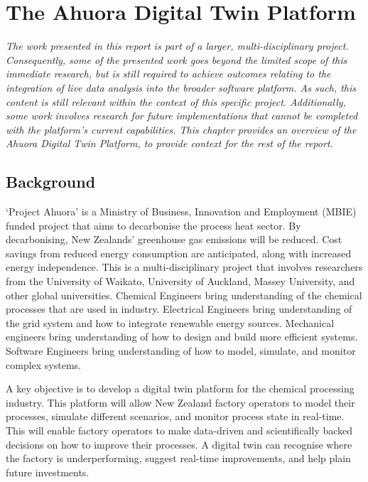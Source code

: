 \chapter{The Ahuora Digital Twin Platform}


\textit{ The work presented in this report is part of a larger, multi-disciplinary project. Consequently, some of the presented work goes beyond the limited scope of this immediate research, but is still required to achieve outcomes relating to the integration of live data analysis into the broader software platform. As such, this content is still relevant within the context of this specific project. Additionally, some work involves research for future implementations that cannot be completed with the platform's current capabilities. This chapter provides an overview of the Ahuora Digital Twin Platform, to provide context for the rest of the report.}

\section{Background}

`Project Ahuora' is a Ministry of Business, Innovation and Employment (MBIE) funded project that aims to decarbonise the process heat sector.
By decarbonising, New Zealands' greenhouse gas emissions will be reduced. Cost savings from reduced energy consumption are anticipated, along with increased energy independence.
This is a multi-disciplinary project that involves researchers from the University of Waikato, University of Auckland, Massey University,
and other global universities. Chemical Engineers bring understanding of the chemical processes that are used in industry. Electrical Engineers bring understanding of the grid system
and how to integrate renewable energy sources. Mechanical engineers bring understanding of how to design and build more efficient systems. Software Engineers bring understanding of how to
model, simulate, and monitor complex systems.

A key objective is to develop a digital twin platform for the chemical processing industry. This platform will allow New Zealand factory operators to model their processes, simulate different scenarios, and monitor process state in real-time.
This will enable factory operators to make data-driven and scientifically backed decisions on how to improve their processes. A digital twin can recognise where the factory is underperforming, suggest real-time improvements, and help plain future investments.

